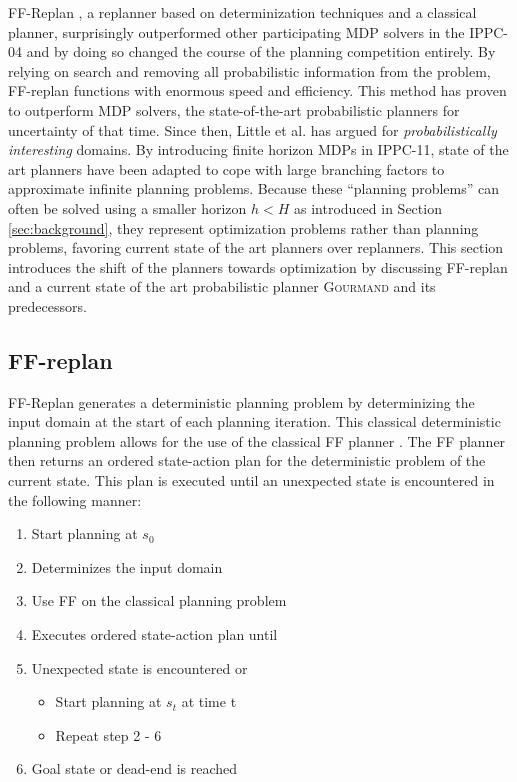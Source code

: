 \documentclass[runningheads,a4paper]{llncs}
\begin{document}
FF-Replan \cite{FFReplan}, a replanner based on determinization techniques and a classical planner, surprisingly outperformed other participating MDP solvers in the IPPC-04 and by doing so changed the course of the planning competition entirely. By relying on search and removing all probabilistic information from the problem, FF-replan functions with enormous speed and efficiency. This method has proven to outperform MDP solvers, the state-of-the-art probabilistic planners for uncertainty of that time. Since then, Little et al. has argued for \emph{probabilistically interesting} domains. By introducing finite horizon MDPs in IPPC-11, state of the art planners have been adapted to cope with large branching factors to approximate infinite planning problems. Because these ``planning problems'' can often be solved using a smaller horizon $h < H$ as introduced in Section \ref{sec:background}, they represent optimization problems rather than planning problems, favoring current state of the art planners over replanners. This section introduces the shift of the planners towards optimization  by discussing FF-replan and a current state of the art probabilistic planner \textsc{Gourmand} and its predecessors.

\subsection{FF-replan}
\label{sec:ffreplan}
 FF-Replan generates a deterministic planning problem by determinizing the input domain at the start of each planning iteration. This classical deterministic planning problem allows for the use of the classical FF planner \cite{Hoffmann01theff}. The FF planner then returns an ordered state-action plan for the deterministic problem of the current state. This plan is executed until an unexpected state is encountered in the following manner:

\begin{enumerate}
	\item Start planning at $s_0$
	\item Determinizes the input domain
	\item Use FF on the classical planning problem
	\item Executes ordered state-action plan until
	\item Unexpected state is encountered or
	\begin{itemize}
		\item Start planning at $s_t$ at time t
		\item Repeat step 2 - 6
	\end{itemize}
	\item Goal state or dead-end is reached
\end{enumerate}
\end{document}
